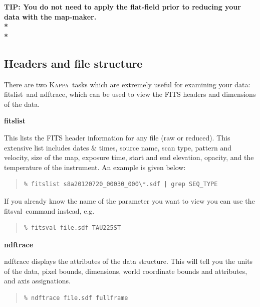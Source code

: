 \documentclass[twoside,11pt]{article}
\newcommand{\xref}[3]{#1}
\newcommand{\xlabel}[1]{}
\renewcommand{\_}{\texttt{\symbol{95}}}
\newenvironment{myquote}{
   \color{MidnightBlue}\begin{quote}\begin{small}}{
   \end{small}\end{quote}
}
\newcommand{\Kappa}{\xref{\textsc{Kappa}}{sun95}{}}
\newcommand{\task}[1]{\textsf{#1}}
\newcommand{\fitslist}{\xref{\task{fitslist}}{sun95}{FITSLIST}}
\newcommand{\fitsval}{\xref{\task{fitsval}}{sun95}{FITSVAL}}
\newcommand{\ndftrace}{\xref{\task{ndftrace}}{sun95}{NDFTRACE}}
\renewenvironment{myquote}{
      \begin{quote}\begin{small}}{
      \end{small}\end{quote}
   }
\begin{document}
\begin{htmlonly}
\textbf{TIP: You do not need to apply the flat-field
prior to reducing your data with the map-maker.\\*\\*}
\end{htmlonly}


\subsection{\xlabel{header}Headers and file structure}
\label{sec:fitsheader}

There are two \Kappa\ tasks which are extremely useful for examining
your data: \fitslist\ and \ndftrace, which can be used to view the
FITS headers and dimensions of the data.
\vspace{5mm}

\begin{center}
\begin{minipage}[t]{0.12\linewidth}
\textbf{fitslist}
\end{minipage}
\begin{minipage}[t]{0.75\linewidth}This lists the FITS header information
for any file (raw or reduced). This extensive list includes dates \& times,
source name, scan type, pattern and velocity, size of the map, exposure
time, start and end elevation, opacity, and the temperature of the
instrument. An example is given below:
\begin{myquote}
\begin{verbatim}
% fitslist s8a20120720_00030_000\*.sdf | grep SEQ_TYPE
\end{verbatim}
\end{myquote}
If you already know the name of the parameter you want to view you can
use the \fitsval\ command instead, e.g.\\
\begin{myquote}
\begin{verbatim}
% fitsval file.sdf TAU225ST
\end{verbatim}
\end{myquote}
\end{minipage}
\newline


\begin{minipage}[t]{0.1\linewidth} \end{minipage}
\begin{minipage}[t]{0.12\linewidth}
\textbf{ndftrace}
\end{minipage}
\begin{minipage}[t]{0.75\linewidth}
\task{ndftrace} displays the attributes of the data structure. This will tell
you the units of the data, pixel bounds, dimensions, world coordinate
bounds and attributes, and axis assignations.
\begin{myquote}
\begin{verbatim}
% ndftrace file.sdf fullframe
\end{verbatim}
\end{myquote}
\end{minipage}
\vspace{4mm}
\end{center}
\end{document}
